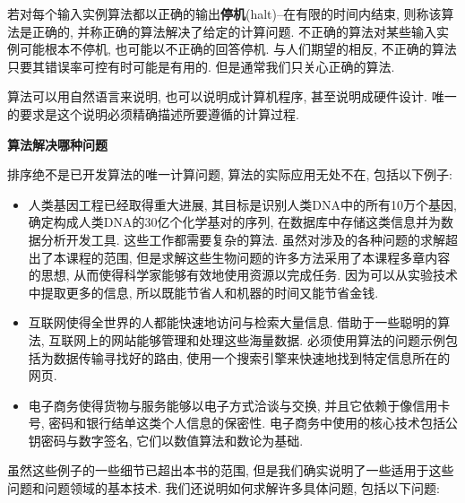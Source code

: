 \documentclass[oneside,10pt,fontset=none]{ctexbook}
\numberwithin{definition}{chapter}
\numberwithin{theorem}{chapter}
\numberwithin{lemma}{chapter}
\begin{document}
若对每个输入实例算法都以正确的输出\textbf{停机}(halt)--在有限的时间内结束, 则称该算法是正确的, 并称正确的算法解决了给定的计算问题. 不正确的算法对某些输入实例可能根本不停机, 也可能以不正确的回答停机. 与人们期望的相反, 不正确的算法只要其错误率可控有时可能是有用的. 但是通常我们只关心正确的算法.

算法可以用自然语言来说明, 也可以说明成计算机程序, 甚至说明成硬件设计. 唯一的要求是这个说明必须精确描述所要遵循的计算过程.

\textbf{算法解决哪种问题}

排序绝不是已开发算法的唯一计算问题, 算法的实际应用无处不在, 包括以下例子:

\begin{itemize}
    \item 人类基因工程已经取得重大进展, 其目标是识别人类DNA中的所有10万个基因, 确定构成人类DNA的30亿个化学基对的序列, 在数据库中存储这类信息并为数据分析开发工具. 这些工作都需要复杂的算法. 虽然对涉及的各种问题的求解超出了本课程的范围, 但是求解这些生物问题的许多方法采用了本课程多章内容的思想, 从而使得科学家能够有效地使用资源以完成任务. 因为可以从实验技术中提取更多的信息, 所以既能节省人和机器的时间又能节省金钱.
    \item 互联网使得全世界的人都能快速地访问与检索大量信息. 借助于一些聪明的算法, 互联网上的网站能够管理和处理这些海量数据. 必须使用算法的问题示例包括为数据传输寻找好的路由, 使用一个搜索引擎来快速地找到特定信息所在的网页.
    \item 电子商务使得货物与服务能够以电子方式洽谈与交换, 并且它依赖于像信用卡号, 密码和银行结单这类个人信息的保密性. 电子商务中使用的核心技术包括公钥密码与数字签名, 它们以数值算法和数论为基础.
\end{itemize}

虽然这些例子的一些细节已超出本书的范围, 但是我们确实说明了一些适用于这些问题和问题领域的基本技术. 我们还说明如何求解许多具体问题, 包括以下问题:
\end{document}
